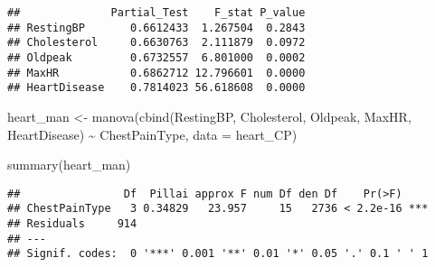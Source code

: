 \documentclass[
]{article}
\newenvironment{Shaded}{\begin{snugshade}}{\end{snugshade}}
\newcommand{\AttributeTok}[1]{\textcolor[rgb]{0.77,0.63,0.00}{#1}}
\newcommand{\CommentTok}[1]{\textcolor[rgb]{0.56,0.35,0.01}{\textit{#1}}}
\newcommand{\FunctionTok}[1]{\textcolor[rgb]{0.00,0.00,0.00}{#1}}
\newcommand{\NormalTok}[1]{#1}
\newcommand{\OtherTok}[1]{\textcolor[rgb]{0.56,0.35,0.01}{#1}}
\newcommand{\SpecialCharTok}[1]{\textcolor[rgb]{0.00,0.00,0.00}{#1}}
\begin{document}
\begin{Shaded}
\end{Shaded}

\begin{verbatim}
##              Partial_Test    F_stat P_value
## RestingBP       0.6612433  1.267504  0.2843
## Cholesterol     0.6630763  2.111879  0.0972
## Oldpeak         0.6732557  6.801000  0.0002
## MaxHR           0.6862712 12.796601  0.0000
## HeartDisease    0.7814023 56.618608  0.0000
\end{verbatim}

\begin{Shaded}
\begin{Highlighting}[]
\NormalTok{heart\_man }\OtherTok{\textless{}{-}} \FunctionTok{manova}\NormalTok{(}\FunctionTok{cbind}\NormalTok{(RestingBP, Cholesterol, Oldpeak, MaxHR, HeartDisease) }\SpecialCharTok{\textasciitilde{}}\NormalTok{ ChestPainType,}
    \AttributeTok{data =}\NormalTok{ heart\_CP)}

\FunctionTok{summary}\NormalTok{(heart\_man)}
\end{Highlighting}
\end{Shaded}

\begin{verbatim}
##                Df  Pillai approx F num Df den Df    Pr(>F)    
## ChestPainType   3 0.34829   23.957     15   2736 < 2.2e-16 ***
## Residuals     914                                             
## ---
## Signif. codes:  0 '***' 0.001 '**' 0.01 '*' 0.05 '.' 0.1 ' ' 1
\end{verbatim}

\begin{Shaded}
\end{Shaded}
\end{document}
